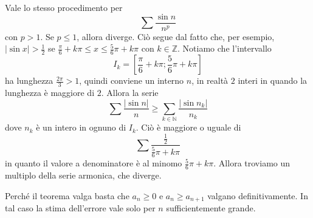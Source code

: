 \documentclass[a4paper]{article}
\begin{document}
Vale lo stesso procedimento per
\[
    \sum \frac{\sin n}{n^p}
\]
con \(p > 1\).
Se \(p \leq 1\), allora diverge. Ciò segue dal fatto che, per esempio,
\(|\sin x| > \frac{1}{2}\) se \(\frac{\pi}{6} + k\pi \leq x \leq \frac{5}{6}\pi + k\pi\)
con \(k\in\mathbb{Z}\). Notiamo che l'intervallo
\[
    I_k = \left[\frac{\pi}{6} + k\pi; \frac{5}{6}\pi + k\pi\right]
\]
ha lunghezza \(\frac{2\pi}{3} > 1\), quindi conviene un interno \(n\),
in realtà \(2\) interi in quando la lunghezza è maggiore di \(2\).
Allora la serie \[
    \sum \frac{|\sin n|}{n}
    \geq 
    \sum_{k\in\mathbb{N}} \frac{|\sin n_k|}{n_k}
\]
dove \(n_k\) è un intero in ognuno di \(I_k\).
Ciò è maggiore o uguale di
\[
    \sum \frac{\frac{1}{2}}{\frac{5}{6} \pi + k\pi}
\]
in quanto il valore a denominatore è al minomo \(\frac{5}{6} \pi + k\pi\).
Allora troviamo un multiplo della serie armonica, che diverge.


Perché il teorema valga basta che \(a_n \geq 0\) e \(a_n \geq a_{n+1}\)
valgano definitivamente.
In tal caso la stima dell'errore vale solo per \(n\) sufficientemente grande.


\pagebreak
\end{document}
